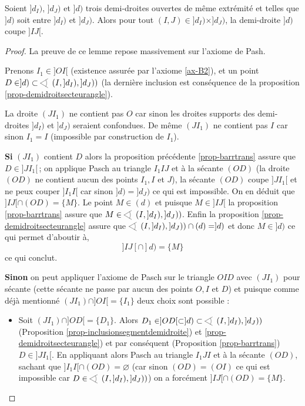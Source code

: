 \begin{lem}\label{lem-barrtrans}
    Soient $]d_I)$, $]d_J)$ et $]d)$ trois demi-droites ouvertes de même extrémité et telles que $]d)$ soit entre $]d_I)$ et $]d_J)$. Alors pour tout $(I,J)\in ]d_I)\times]d_J)$, la demi-droite $]d)$ coupe $]IJ[$.
    \begin{proof}
        La preuve de ce lemme repose massivement sur l'axiome de Pash.

        Prenons $I_1 \in ]OI[$ (existence assurée par l'axiome \ref{ax-B2}), et un point $D\in ]d)\subset \anglesaillant\left(I,]d_I),]d_J)\right)$ (la dernière inclusion est conséquence de la proposition \ref{prop-demidroitsecteurangle}). 

        La droite $(JI_1)$ ne contient pas $O$ car sinon les droites supports des demi-droites $]d_I)$ et $]d_J)$ seraient confondues. De même $(J I_1)$ ne contient pas $I$ car sinon $I_1 = I$ (impossible par construction de $I_1$). 
        
        \textbf{Si} $(JI_1)$ contient $D$ alors la proposition précédente \ref{prop-barrtrans} assure que $D\in]JI_1[$\,; on applique Pasch au triangle $I_1 I J$ et à la sécante $(OD)$ (la droite $(OD)$ ne contient aucun des points $I_1, I$ et $J$), la sécante $(OD)$ coupe $]JI_1[$ et ne peux couper $]I_1 I[$ car sinon $]d)=]d_J)$ ce qui est impossible. On en déduit que $]IJ[\cap (OD)=\{M\}$. Le point $M\in (d)$ et puisque $M\in ]IJ[$ la proposition \ref{prop-barrtrans} assure que $M\in \anglesaillant\left(I,]d_I),]d_J)\right)$. Enfin la proposition \ref{prop-demidroitsecteurangle} assure que $\anglesaillant\left(I,]d_I),]d_J)\right) \cap (d) = ]d)$ et donc $M\in ]d)$ ce qui permet d'aboutir à,
        \begin{equation*}
            ]IJ[\cap ]d) =\{M\}
        \end{equation*}
        ce qui conclut.

        \textbf{Sinon} on peut appliquer l'axiome de Pasch sur le triangle $OID$ avec $(JI_1)$ pour sécante (cette sécante ne passe par aucun des points $O,I$ et $D$) et puisque comme déjà mentionné $(JI_1)\cap ]OI[=\{I_1\}$ deux choix sont possible : 
        \begin{itemize}[$\bullet$]
            \item Soit $(JI_1)\cap ]OD[=\{D_1\}$. Alors $D_1 \in ]OD[\subset ]d) \subset \anglesaillant\left(I,]d_I),]d_J)\right)$ (Proposition \ref{prop-inclusionsegmentdemidroite}) et \ref{prop-demidroitsecteurangle}) et par conséquent (Proposition \ref{prop-barrtrans}) $D\in]JI_1[$. En appliquant alors Pasch au triangle $I_1JI$ et à la sécante $(OD)$, sachant que $]I_1 I[\cap (OD)=\varnothing$ (car sinon $(OD)=(OI)$ ce qui est impossible car $D\in \anglesaillant\left(I,]d_I),]d_J)\right)$) on a forcément $]IJ[\cap (OD)=\{M\}$. 
            

\end{itemize}
\end{proof}
\end{lem}
